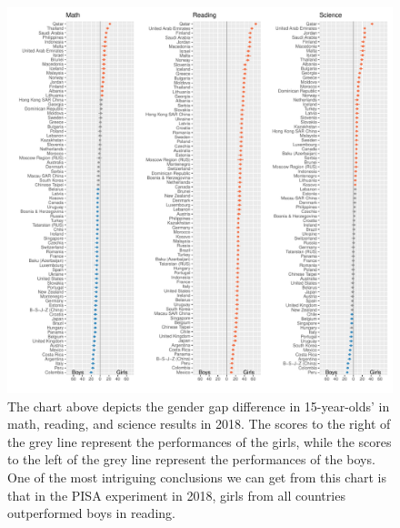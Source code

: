 \begin{figure}[H]
\includegraphics[width=1\linewidth]{learningtower_files/figure-latex/score-differences-1} \caption{The chart above depicts the gender gap difference in 15-year-olds' in math, reading, and science results in 2018. The scores to the right of the grey line represent the performances of the girls, while the scores to the left of the grey line represent the performances of the boys. One of the most intriguing conclusions we can get from this chart is that in the PISA experiment in 2018, girls from all countries outperformed boys in reading.}\label{fig:score-differences}
\end{figure}

